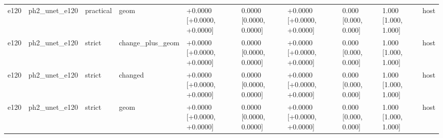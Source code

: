 \begin{table}[t]
\begin{tabular}{llllllllll}
e120 & ph2\_unet\_e120 & practical & geom & +0.0000 [+0.0000, +0.0000] & 0.0000 [0.0000, 0.0000] & +0.0000 [+0.0000, +0.0000] & 0.000 [0.000, 0.000] & 1.000 [1.000, 1.000] & host \\
e120 & ph2\_unet\_e120 & strict & change\_plus\_geom & +0.0000 [+0.0000, +0.0000] & 0.0000 [0.0000, 0.0000] & +0.0000 [+0.0000, +0.0000] & 0.000 [0.000, 0.000] & 1.000 [1.000, 1.000] & host \\
e120 & ph2\_unet\_e120 & strict & changed & +0.0000 [+0.0000, +0.0000] & 0.0000 [0.0000, 0.0000] & +0.0000 [+0.0000, +0.0000] & 0.000 [0.000, 0.000] & 1.000 [1.000, 1.000] & host \\
e120 & ph2\_unet\_e120 & strict & geom & +0.0000 [+0.0000, +0.0000] & 0.0000 [0.0000, 0.0000] & +0.0000 [+0.0000, +0.0000] & 0.000 [0.000, 0.000] & 1.000 [1.000, 1.000] & host \\
\bottomrule
\end{tabular}
\end{table}
